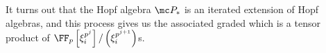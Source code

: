 \documentclass[../notes.tex]{subfiles}
\begin{document}
\begin{remark}
	It turns out that the Hopf algebra $\mc P_*$  is an iterated extension of Hopf algebras, and this process gives us the associated graded which is a tensor product of $\FF_p\left[\xi_i^{p^j}\right]/\left(\xi_i^{p^{j+1}}\right)$s.
\end{remark}
\end{document}
